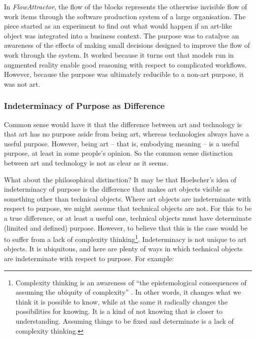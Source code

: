 \documentclass[letterpaper]{article}
\begin{document}
    In \emph{FlowAttractor}, the flow of the blocks represents the otherwise invisible flow of work items through the software production system of a large organisation. The piece started as an experiment to find out what would happen if an art-like object was integrated into a business context. The purpose was to catalyse an awareness of the effects of making small decisions designed to improve the flow of work through the system. It worked because it turns out that models run in augmented reality enable good reasoning with respect to complicated workflows. However, because the purpose was ultimately reducible to a non-art purpose, it was not art.

    \subsubsection{Indeterminacy of Purpose as Difference}

    Common sense would have it that the difference between art and technology is that art has no purpose aside from being art, whereas technologies always have a useful purpose. However, being art – that is, embodying meaning – is a useful purpose, at least in some people's opinion. So the common sense distinction between art and technology is not as clear as it seems.

    What about the philosophical distinction? It may be that Hoelscher's idea of indeterminacy of purpose is the difference that makes art objects visible as something other than technical objects. Where art objects are indeterminate with respect to purpose, we might assume that technical objects are not. For this to be a true difference, or at least a useful one, technical objects must have determinate (limited and defined) purpose. However, to believe that this is the case would be to suffer from a lack of complexity thinking\footnote{

        Complexity thinking is an awareness of “the epistemological consequences of assuming the ubiquity of complexity” \citep{CilliersRichardsonCmplxtyScnc2001}. In other words, it changes what we think it is possible to know, while at the same it radically changes the possibilities for knowing. It is a kind of not knowing that is closer to understanding. Assuming things to be fixed and determinate is a lack of complexity thinking.
    
    }. Indeterminacy is not unique to art objects. It is ubiquitous, and here are plenty of ways in which technical objects are indeterminate with respect to purpose. For example:
\end{document}
